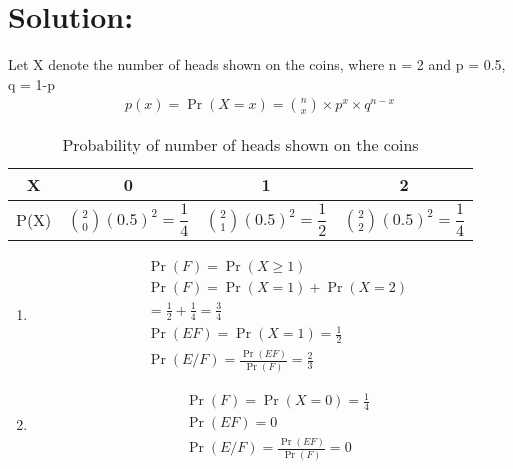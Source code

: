 \documentclass[journal,12pt,twocolumn]{IEEEtran}
\begin{document}
\section*{Solution:}
Let X denote the number of heads shown on the coins, where n = 2 and p = 0.5, q = 1-p
\begin{align}
p(x) = \Pr(X=x) = \binom{n}{x}\times p^x\times q^{n-x}
\end{align}
\begin{table}[H]
\resizebox{\columnwidth}{!} {
\begin{tabular}{|c|c|c|c|}
\hline
     X&0&1&2  \\
     \hline
     P(X)&$\binom{2}{0}(0.5)^2=\dfrac{1}{4}$&$\binom{2}{1}(0.5)^2 = \dfrac{1}{2}$&$\binom{2}{2}(0.5)^2 = \dfrac{1}{4}$\\
     \hline
\end{tabular}
}
\caption{Probability of number of heads shown on the coins }
\label{table:1}
\end{table}
\begin{enumerate}[label=\roman*]
\item 
\begin{align}
&\Pr(F) = \Pr(X\geq 1)\\
&\Pr(F) = \Pr(X = 1) + \Pr(X = 2)\nonumber\\
       &= \frac{1}{2} + \frac{1}{4} = \frac{3}{4}\\
&\Pr(EF) = \Pr(X = 1) = \frac{1}{2}\\
&\Pr(E/F) =\frac{\Pr(EF)}{\Pr(F)} = \frac{2}{3}
\end{align}
\item
\begin{align}
&\Pr(F) = \Pr(X = 0) = \frac{1}{4}\\
&\Pr(EF) = 0\\
&\Pr(E/F) = \frac{\Pr(EF)}{\Pr(F)} = 0
\end{align} 
\end{enumerate}
\end{document}

